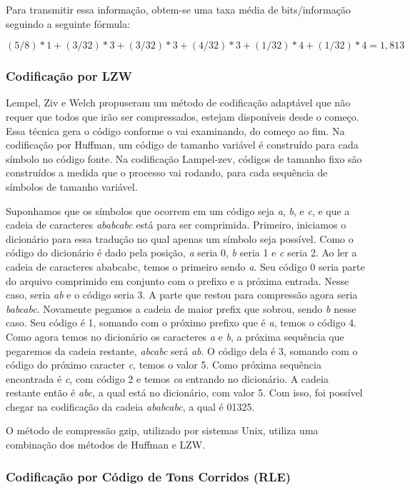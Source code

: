 Para transmitir essa informação, obtem-se uma taxa média de bits/informação seguindo a seguinte fórmula:

\[ (5/8)*1 + (3/32)*3 + (3/32)*3 + (4/32)*3 + (1/32)*4 + (1/32)*4 = 1,813 \]

\subsubsection{Codificação por LZW}
\label{sss.lzw}

Lempel, Ziv e Welch propuseram um método de codificação adaptável que não requer que todos que irão ser compressados, estejam disponíveis desde o começo. Essa técnica gera o código conforme o vai examinando, do começo ao fim. Na codificação por Huffman, um código de tamanho variável é construído para cada símbolo no código fonte. Na codificação Lampel-zev, códigos de tamanho fixo são construídos a medida que o processo vai rodando, para cada sequência de símbolos de tamanho variável.

Suponhamos que os símbolos que ocorrem em um código seja {\em a}, {\em b}, e {\em c}, e que a cadeia de caracteres {\em ababcabc} está para ser comprimida. Primeiro, iniciamos o dicionário para essa tradução no qual apenas um símbolo seja possível. Como o código do dicionário é dado pela posição, {\em a} seria 0, {\em b} seria 1 e {\em c} seria 2. Ao ler a cadeia de caracteres ababcabc, temos o primeiro sendo {\em a}. Seu código 0 seria parte do arquivo comprimido em conjunto com o prefixo e a próxima entrada. Nesse caso, seria {\em ab} e o código seria 3. A parte que restou para compressão agora seria {\em babcabc}. Novamente pegamos a cadeia de maior prefix que sobrou, sendo {\em b} nesse caso. Seu código é 1, somando com o próximo prefixo que é {\em a}, temos o código 4. Como agora temos no dicionário os caracteres {\em a} e {\em b}, a próxima sequência que pegaremos da cadeia restante, {\em abcabc} será {\em ab}. O código dela é 3, somando com o código do próximo caracter {\em c}, temos o valor 5. Como próxima sequência encontrada é {\em c}, com código 2 e temos {\em ca} entrando no dicionário. A cadeia restante então é {\em abc}, a qual está no dicionário, com valor 5. Com isso, foi possível chegar na codificação da cadeia {\em ababcabc}, a qual é 01325.

O método de compressão gzip, utilizado por sistemas Unix, utiliza uma combinação dos métodos de Huffman e LZW.

\subsubsection{Codificação por Código de Tons Corridos (RLE)}
\label{sss.runlength}


